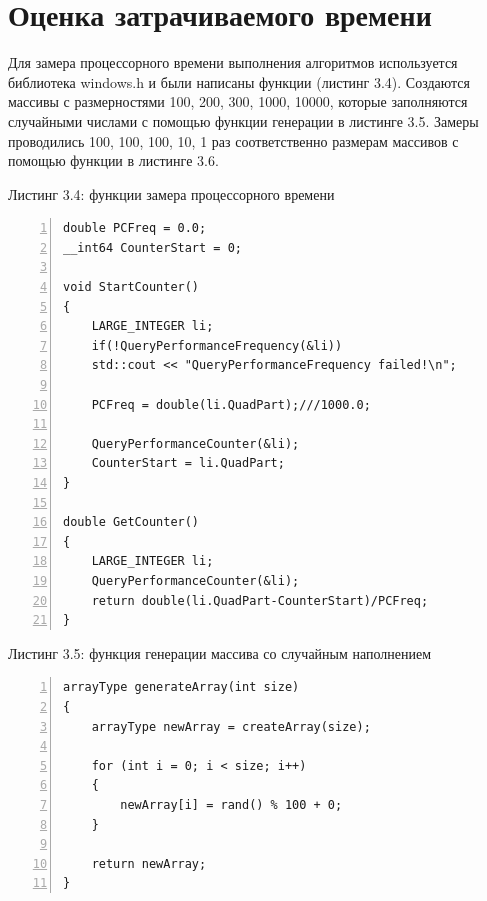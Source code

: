 \documentclass[12pt,a4paper]{report}
\begin{document}
\section{Оценка затрачиваемого времени}

Для замера процессорного времени выполнения алгоритмов используется библиотека windows.h и были написаны функции 
(листинг 3.4). 
Создаются массивы с размерностями 100, 200, 300, 1000, 10000, которые заполняются случайными числами с помощью 
функции генерации в листинге 3.5. 
Замеры проводились 100, 100, 100, 10, 1 раз соответственно размерам массивов с помощью функции в листинге 3.6.

\textrm{Листинг 3.4: функции замера процессорного времени}
\begin{lstlisting}[frame=single, numbers=left]
double PCFreq = 0.0;
__int64 CounterStart = 0;
    
void StartCounter()
{
    LARGE_INTEGER li;
    if(!QueryPerformanceFrequency(&li))
    std::cout << "QueryPerformanceFrequency failed!\n";
    
    PCFreq = double(li.QuadPart);///1000.0;
    
    QueryPerformanceCounter(&li);
    CounterStart = li.QuadPart;
}
    
double GetCounter()
{
    LARGE_INTEGER li;
    QueryPerformanceCounter(&li);
    return double(li.QuadPart-CounterStart)/PCFreq;
}
\end{lstlisting}

\textrm{Листинг 3.5: функция генерации массива со случайным наполнением}
\begin{lstlisting}[frame=single, numbers=left]
arrayType generateArray(int size)
{
    arrayType newArray = createArray(size);
    
    for (int i = 0; i < size; i++) 
    {
        newArray[i] = rand() % 100 + 0;
    }
    
    return newArray;
}
\end{lstlisting}
\end{document}
